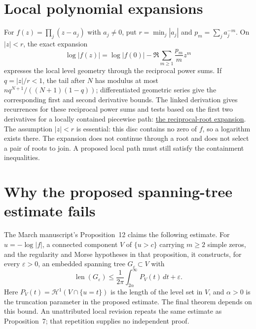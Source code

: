 \documentclass[11pt]{article}
\begin{document}
\section{Local polynomial expansions}
\label{sec:reciprocal}

For $f(z)=\prod_j(z-a_j)$ with $a_j\ne0$, put $r=\min_j|a_j|$ and
$p_m=\sum_j a_j^{-m}$.  On $|z|<r$, the exact expansion
\[
 \log|f(z)|=\log|f(0)|-\Re\sum_{m\ge1}\frac{p_m}{m}z^m
\]
expresses the local level geometry through the reciprocal power sums.  If $q=|z|/r<1$,
the tail after $N$ has modulus at most
$nq^{N+1}/((N+1)(1-q))$; differentiated geometric series give the
corresponding first and second derivative bounds.
The linked derivation gives recurrences for these reciprocal power sums
and tests based on the first two derivatives for a locally contained
piecewise path:
\href{https://github.com/wcook04/plectis-erdos/blob/f36a98bf3d3e6f65f1074e3b800e3293d5b8a51a/ErdosProblems/Erdos1041/ReciprocalNewtonExpansion.md}{the reciprocal-root expansion}.
The assumption $|z|<r$ is essential: this disc contains no zero of $f$,
so a logarithm exists there. The expansion does not continue through a
root and does not select a pair of roots to join. A proposed local path
must still satisfy the containment inequalities.

\section{Why the proposed spanning-tree estimate fails}\label{sec:gap}

The March manuscript's Proposition~12 claims the following
estimate.  For $u=-\log|f|$, a connected component $V$ of $\{u>c\}$ carrying
$m\ge2$ simple zeros, and the regularity and Morse hypotheses in that proposition, it
constructs, for every $\varepsilon>0$, an embedded spanning tree
$G_\varepsilon\subset V$ with
\[
 \operatorname{len}(G_\varepsilon)
 \le\frac1{2\pi}\int_{2\alpha}^{\infty}P_V(t)\,dt+\varepsilon.
\tag{5.1}\label{eq:prop12-bound}
\]
Here $P_V(t)=\mathcal H^1(V\cap\{u=t\})$ is the length of the level
set in $V$, and $\alpha>0$ is the truncation parameter in the proposed
estimate. The final theorem depends on this bound.  An unattributed local revision repeats the same estimate as Proposition~7;
that repetition supplies no independent proof.
\end{document}
